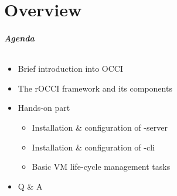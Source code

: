 \part{Overview}

\begin{frame}
  \frametitle{Agenda}
  \framesubtitle{}
  \begin{itemize}
    \item Brief introduction into OCCI
    \item The rOCCI framework and its components
    \item Hands-on part
      \begin{itemize}
        \item Installation \& configuration of \rocci-server
        \item Installation \& configuration of \rocci-cli
        \item Basic VM life-cycle management tasks
      \end{itemize}
    \item Q \& A
  \end{itemize}
\end{frame}

